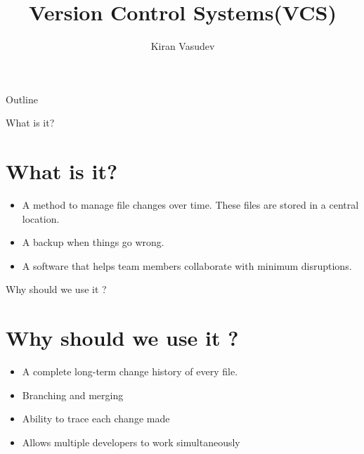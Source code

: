 \documentclass{beamer}
\title{Version Control Systems(VCS)}
\author{Kiran Vasudev\inst{1}}
\institute[]
{
  \inst{1}
  Hochschule Bonn-Rhein-Sieg

}
\begin{document}
\begin{frame}
  \titlepage
\end{frame}

\begin{frame}{Outline}
  \tableofcontents
\end{frame}

\begin{frame}{What is it?}
\section{What is it?}
  \begin{itemize}
  \item {
    A method to manage file changes over time. These files are stored in a central location.
  }
  \item {
    A backup when things go wrong.
  }
  \item{A software that helps team members collaborate with minimum disruptions.}
  \end{itemize}
\end{frame}

\begin{frame}{Why should we use it ?}
\section{Why should we use it ?}
  \begin{itemize}
  \item {
    A complete long-term change history of every file.
  }
  \item {   
    Branching and merging
  }
  \item {   
    Ability to trace each change made
  }
  \item {   
	Allows multiple developers to work simultaneously
  }
  \end{itemize}
\end{frame}
\end{document}
